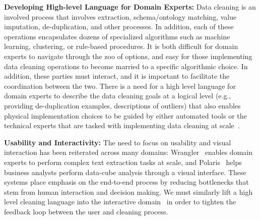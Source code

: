 
\vspace{0.5em}
\noindent\textbf{Developing High-level Language for Domain Experts:} Data cleaning is an involved process that involves extraction, schema/ontology matching, value imputation, de-duplication, and other processes.
In addition, each of these operations encapsulates dozens of specialized algorithms such as machine learning, clustering, or rule-based procedures.
It is both difficult for domain experts to navigate through the zoo of options, and easy for those implementing data cleaning operations to become married to a specific algorithmic choice.
In addition, these parties must interact, and it is important to facilitate the coordination between the two.
There is a need for a high level language for domain experts to describe the data cleaning goals at a logical level (e.g., providing de-duplication examples, descriptions of outliers) that also enables physical implementation choices to be guided by either automated tools or the technical experts that are tasked with implementing data cleaning at scale~\cite{DBLP:conf/sigmod/Galhardas00,wisteria}. 

\vspace{0.5em}
\noindent\textbf{Usability and Interactivity:} The need to focus on usability and visual interaction has been reiterated across many domains:  Wrangler~\cite{kandel2011wrangler} enables domain experts to perform complex text extraction tasks at scale, and  Polaris~\cite{stolte2002polaris} helps business analysts perform data-cube analysis through a visual interface. These systems place emphasis on the end-to-end process by reducing bottlenecks that stem from human interaction and decision making.    We must similarly lift a high level cleaning language into the interactive domain~\cite{heer2015predictive} in order to tighten the feedback loop between the user and cleaning process.

